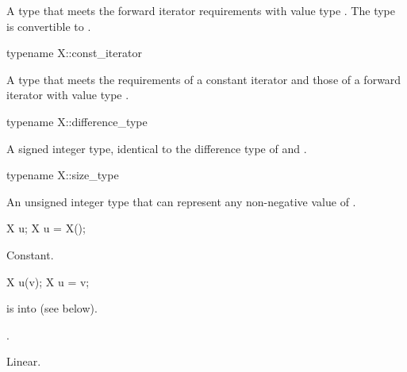 \begin{itemdescr}
\pnum
\result
A type that meets the forward iterator requirements
with value type .
The type  is convertible to .
\end{itemdescr}

%
\begin{itemdecl}
typename X::const_iterator
\end{itemdecl}

\begin{itemdescr}
\pnum
\result
A type that meets the requirements of a constant iterator and
those of a forward iterator with value type .
\end{itemdescr}

%
\begin{itemdecl}
typename X::difference_type
\end{itemdecl}

\begin{itemdescr}
\pnum
\result
A signed integer type,
identical to the difference type of
 and .
\end{itemdescr}

%
\begin{itemdecl}
typename X::size_type
\end{itemdecl}

\begin{itemdescr}
\pnum
\result
An unsigned integer type
that can represent any non-negative value of .
\end{itemdescr}

\begin{itemdecl}
X u;
X u = X();
\end{itemdecl}

\begin{itemdescr}
\pnum
\ensures
{}

\pnum
\complexity
Constant.
\end{itemdescr}

\begin{itemdecl}
X u(v);
X u = v;
\end{itemdecl}

\begin{itemdescr}
\pnum
\expects
{} is  into  (see below).

\pnum
\ensures
{}.

\pnum
\complexity
Linear.
\end{itemdescr}

